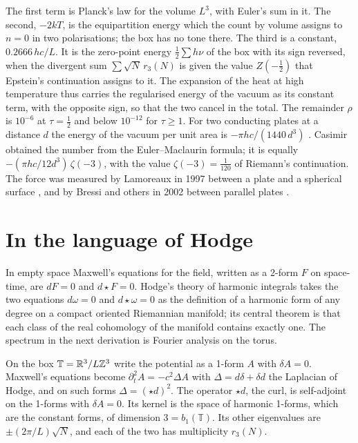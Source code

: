 \documentclass[11pt]{article}
\begin{document}
\physical
The first term is Planck's law for the volume $L^3$, with Euler's sum in it.
The second, $-2kT$, is the equipartition energy which the count by volume assigns to $n=0$ in two polarisations; the box has no tone there.
The third is a constant, $0.2666\,hc/L$.
It is the zero-point energy $\tfrac12\sum h\nu$ of the box with its sign reversed, when the divergent sum $\sum\sqrt N\,r_3(N)$ is given the value $Z(-\tfrac12)$ that Epstein's continuation assigns to it.
The expansion of the heat at high temperature thus carries the regularised energy of the vacuum as its constant term, with the opposite sign, so that the two cancel in the total.
The remainder $\rho$ is $10^{-6}$ at $\tau = \tfrac12$ and below $10^{-12}$ for $\tau\ge1$.
For two conducting plates at a distance $d$ the energy of the vacuum per unit area is $-\pi hc/(1440\,d^3)$ \cite{Casimir}.
Casimir obtained the number from the Euler--Maclaurin formula; it is equally $-(\pi hc/12d^3)\,\zeta(-3)$, with the value $\zeta(-3) = \tfrac1{120}$ of Riemann's continuation.
The force was measured by Lamoreaux in 1997 between a plate and a spherical surface \cite{Lamoreaux}, and by Bressi and others in 2002 between parallel plates \cite{Bressi}.

\section{In the language of Hodge}

In empty space Maxwell's equations for the field, written as a 2-form $F$ on space-time, are $dF = 0$ and $d{\star}F = 0$.
Hodge's theory of harmonic integrals \cite{Hodge} takes the two equations $d\omega = 0$ and $d{\star}\omega = 0$ as the definition of a harmonic form of any degree on a compact oriented Riemannian manifold; its central theorem is that each class of the real cohomology of the manifold contains exactly one.
The spectrum in the next derivation is Fourier analysis on the torus.

\begin{derivation}\label{d:hodge}
On the box $\mathbb T = \mathbb{R}^3/L\mathbb{Z}^3$ write the potential as a 1-form $A$ with $\delta A = 0$.
Maxwell's equations become $\partial_t^2A = -c^2\Delta A$ with $\Delta = d\delta+\delta d$ the Laplacian of Hodge, and on such forms $\Delta = ({\star}d)^2$.
The operator ${\star}d$, the curl, is self-adjoint on the 1-forms with $\delta A = 0$.
Its kernel is the space of harmonic 1-forms, which are the constant forms, of dimension $3 = b_1(\mathbb T)$.
Its other eigenvalues are $\pm(2\pi/L)\sqrt N$, and each of the two has multiplicity $r_3(N)$.
\end{derivation}
\end{document}
